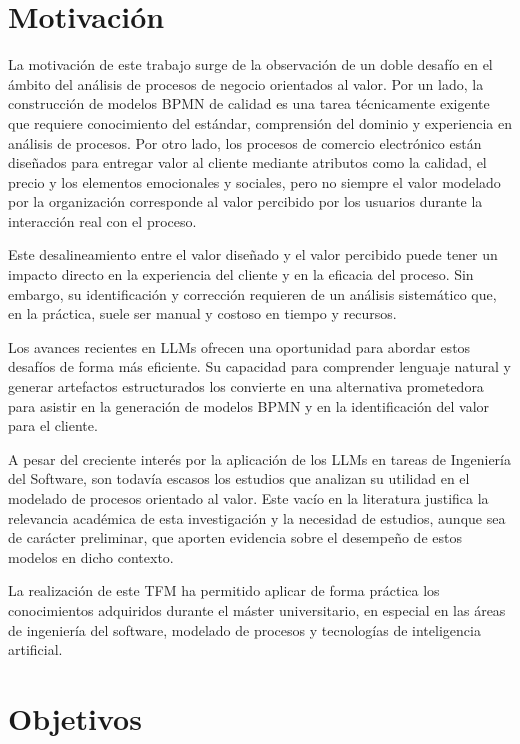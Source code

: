 \section{Motivación}

La motivación de este trabajo surge de la observación de un doble desafío en el ámbito del análisis de procesos de negocio orientados al valor. Por un lado, la construcción de modelos BPMN de calidad es una tarea técnicamente exigente que requiere conocimiento del estándar, comprensión del dominio y experiencia en análisis de procesos. Por otro lado, los procesos de comercio electrónico están diseñados para entregar valor al cliente mediante atributos como la calidad, el precio y los elementos emocionales y sociales, pero no siempre el valor modelado por la organización corresponde al valor percibido por los usuarios durante la interacción real con el proceso.

Este desalineamiento entre el valor diseñado y el valor percibido puede tener un impacto directo en la experiencia del cliente y en la eficacia del proceso. Sin embargo, su identificación y corrección requieren de un análisis sistemático que, en la práctica, suele ser manual y costoso en tiempo y recursos.

Los avances recientes en LLMs ofrecen una oportunidad para abordar estos desafíos de forma más eficiente. Su capacidad para comprender lenguaje natural y generar artefactos estructurados los convierte en una alternativa prometedora para asistir en la generación de modelos BPMN y en la identificación del valor para el cliente.

A pesar del creciente interés por la aplicación de los LLMs en tareas de Ingeniería del Software, son todavía escasos los estudios que analizan su utilidad en el modelado de procesos orientado al valor. Este vacío en la literatura justifica la relevancia académica de esta investigación y la necesidad de estudios, aunque sea de carácter preliminar, que aporten evidencia sobre el desempeño de estos modelos en dicho contexto.

La realización de este TFM ha permitido aplicar de forma práctica los conocimientos adquiridos durante el máster universitario, en especial en las áreas de ingeniería del software, modelado de procesos y tecnologías de inteligencia artificial.

\section{Objetivos}

